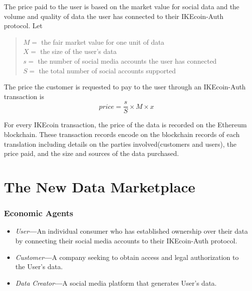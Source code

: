 \documentclass[12pt, letterpaper, twoside]{article}
\begin{document}
The price paid to the user is based on the market value for social data and the volume and quality of data the user has connected to their IKEcoin-Auth protocol. Let \\
\begin{quote}
$M =$ the fair market value for one unit of data\\
$X =$ the size of the user's data\\
$s =$ the number of social media accounts the user has connected\\
$S =$ the total number of social accounts supported\\
\end{quote}
The price the customer is requested to pay to the user through an IKEcoin-Auth transaction is \\
\begin{equation} 
price=\frac{s}{S} \times M \times x 
\end{equation}

For every IKEcoin transaction, the price of the data is recorded on the Ethereum blockchain. These transaction records encode on the blockchain records of each translation including details on the parties involved(customers and users), the price paid, and the size and sources of the data purchased.

\section{The New Data Marketplace}
\subsubsection*{Economic Agents}
\begin{itemize}
\item \textit{User}\textbf{---}An individual consumer who has established ownership over their data by connecting their social media accounts to their IKEcoin-Auth protocol.
\item \textit{Customer}\textbf{---}A company seeking to obtain access and legal authorization to the User's data.
\item \textit{Data Creator}\textbf{---}A social media platform that generates User's data.
\end{itemize}
\end{document}
